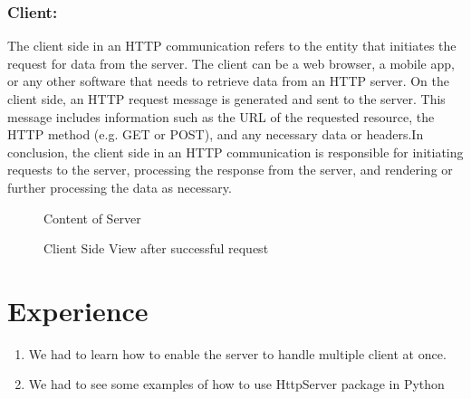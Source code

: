 \documentclass[11pt]{article}
\begin{document}
\subsubsection{Client: }
The client side in an HTTP communication refers to the entity that initiates the request for data
from the server. The client can be a web browser, a mobile app, or any other software that needs to
retrieve data from an HTTP server. On the client side, an HTTP request message is generated and
sent to the server. This message includes information such as the URL of the requested resource,
the HTTP method (e.g. GET or POST), and any necessary data or headers.In conclusion, the client
side in an HTTP communication is responsible for initiating requests to the server, processing the
response from the server, and rendering or further processing the data as necessary.
\begin{figure}[!h]
\centering
\caption{Content of Server}
\end{figure}

\begin{figure}[!h]
\centering
\caption{Client Side View after successful request}
\end{figure}


\newpage
\section{Experience}
\begin{enumerate}
\item We had to learn how to enable the server to handle multiple client at once.
\item We had to see some examples of how to use HttpServer package in Python
\end{enumerate}



\nocite{*}
\end{document}
